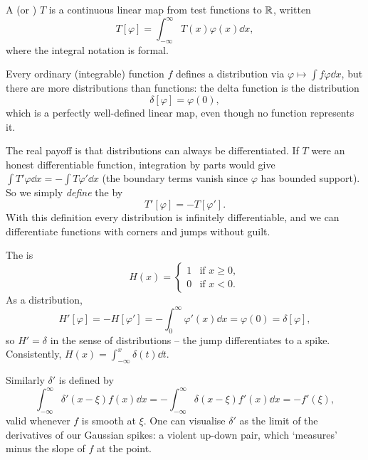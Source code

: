\documentclass[a4paper]{scrartcl}
\begin{document}
\begin{definition}[Distribution]
    A  (or ) $T$ is a continuous linear map from test functions to $\mathbb{R}$, written
    $$
    T[\varphi] = \int_{-\infty}^{\infty} T(x) \varphi(x) \dd x,
    $$
    where the integral notation is formal.
\end{definition}

Every ordinary (integrable) function $f$ defines a distribution via $\varphi \mapsto \int f \varphi \dd x$, but there are more distributions than functions: the delta function is the distribution
$$
\delta[\varphi] = \varphi(0),
$$
which is a perfectly well-defined linear map, even though no function represents it.

The real payoff is that distributions can always be differentiated. If $T$ were an honest differentiable function, integration by parts would give $\int T' \varphi \dd x = -\int T \varphi' \dd x$ (the boundary terms vanish since $\varphi$ has bounded support). So we simply \emph{define} the  by
$$
T'[\varphi] = -T[\varphi'].
$$
With this definition every distribution is infinitely differentiable, and we can differentiate functions with corners and jumps without guilt.

\begin{example}
    The  is
    $$
    H(x) = \begin{cases}
        1 &\mbox{if } x \geq 0, \\
        0 &\mbox{if } x < 0.
    \end{cases}
    $$
    As a distribution,
    $$
    H'[\varphi] = -H[\varphi'] = -\int_0^{\infty} \varphi'(x) \dd x = \varphi(0) = \delta[\varphi],
    $$
    so $H' = \delta$ in the sense of distributions -- the jump differentiates to a spike. Consistently, $H(x) = \int_{-\infty}^x \delta(t) \dd t$.
\end{example}

\begin{example}
    Similarly $\delta'$ is defined by
    $$
    \int_{-\infty}^{\infty} \delta'(x - \xi) f(x) \dd x = -\int_{-\infty}^{\infty} \delta(x - \xi) f'(x) \dd x = -f'(\xi),
    $$
    valid whenever $f$ is smooth at $\xi$. One can visualise $\delta'$ as the limit of the derivatives of our Gaussian spikes: a violent up-down pair, which `measures' minus the slope of $f$ at the point.
\end{example}
\end{document}
